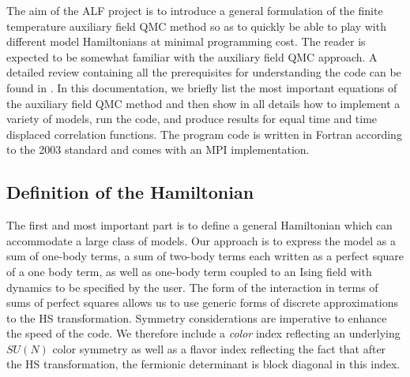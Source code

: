 The aim of the ALF project is to introduce a general formulation of the finite temperature  auxiliary field QMC method  so as to quickly be able to play with different model Hamiltonians  at  minimal programming cost.      
The reader is expected to be somewhat familiar with the auxiliary field QMC  approach. A detailed review containing all  the prerequisites for understanding  the code can be found in \cite{Assaad08_rev}.    
In this documentation, we briefly list the most important equations of the auxiliary field QMC method and then show in all details how to implement a variety of models, run the code, and produce  results for  equal time and time displaced correlation functions. 
The program code is written in Fortran according to the 2003 standard and  comes with an MPI implementation.  


\subsection{Definition of the Hamiltonian}

The first and most important  part is to define a general Hamiltonian which  can  accommodate a large class of models. 
Our approach is to express the model as a sum of one-body terms, a sum of two-body terms each written as a perfect square of a one body term, as well as one-body  term  coupled to an Ising field with  dynamics to be specified by the user. 
The form of the interaction in terms of sums of perfect squares allows us to use generic forms of  discrete  approximations to the  HS  transformation. 
Symmetry considerations  are  imperative to enhance the speed of the code.  
We therefore include a \textit{color} index  reflecting  an underlying  $SU(N)$ color symmetry as  well as a flavor index  reflecting  the fact that  after  the HS  transformation,  the  fermionic determinant is block diagonal in this index.


